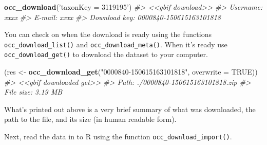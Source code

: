 \documentclass[author-year, review, 11pt]{components/elsarticle} %
\newenvironment{Shaded}{\begin{snugshade}}{\end{snugshade}}
\newcommand{\KeywordTok}[1]{\textcolor[rgb]{0.13,0.29,0.53}{\textbf{{#1}}}}
\newcommand{\DataTypeTok}[1]{\textcolor[rgb]{0.13,0.29,0.53}{{#1}}}
\newcommand{\StringTok}[1]{\textcolor[rgb]{0.31,0.60,0.02}{{#1}}}
\newcommand{\CommentTok}[1]{\textcolor[rgb]{0.56,0.35,0.01}{\textit{{#1}}}}
\newcommand{\OtherTok}[1]{\textcolor[rgb]{0.56,0.35,0.01}{{#1}}}
\newcommand{\NormalTok}[1]{{#1}}
\begin{document}
\begin{Shaded}
\begin{Highlighting}[]
\KeywordTok{occ_download}\NormalTok{(}\StringTok{'taxonKey = 3119195'}\NormalTok{)}
\CommentTok{#> <<gbif download>>}
\CommentTok{#>   Username: xxxx}
\CommentTok{#>   E-mail: xxxx}
\CommentTok{#>   Download key: 0000840-150615163101818}
\end{Highlighting}
\end{Shaded}

You can check on when the download is ready using the functions
\texttt{occ\_download\_list()} and \texttt{occ\_download\_meta()}. When
it's ready use \texttt{occ\_download\_get()} to download the dataset to
your computer.

\begin{Shaded}
\begin{Highlighting}[]
\NormalTok{(res <-}\StringTok{ }\KeywordTok{occ_download_get}\NormalTok{(}\StringTok{"0000840-150615163101818"}\NormalTok{, }\DataTypeTok{overwrite =} \OtherTok{TRUE}\NormalTok{))}
\CommentTok{#> <<gbif downloaded get>>}
\CommentTok{#>   Path: ./0000840-150615163101818.zip}
\CommentTok{#>   File size: 3.19 MB}
\end{Highlighting}
\end{Shaded}

What's printed out above is a very brief summary of what was downloaded,
the path to the file, and its size (in human readable form).

Next, read the data in to R using the function
\texttt{occ\_download\_import()}.

\begin{Shaded}
\end{Shaded}
\end{document}
